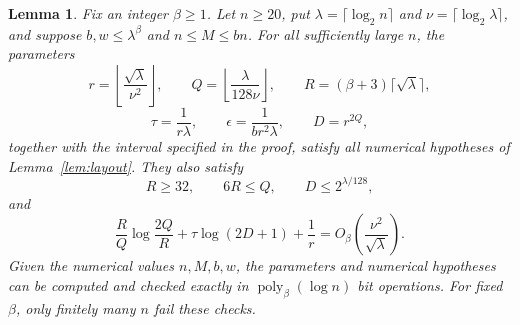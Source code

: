 \documentclass[11pt,reqno]{amsart}
\numberwithin{equation}{section}
\newtheorem{lemma}[theorem]{Lemma}
\theoremstyle{definition}\newtheorem{definition}[theorem]{Definition}
\theoremstyle{remark}\newtheorem{remark}[theorem]{Remark}
\newcommand{\poly}{\operatorname{poly}}
\renewcommand{\le}{\leqslant}
\renewcommand{\ge}{\geqslant}
\begin{document}
\begin{lemma}\label{lem:incidence-parameters}
Fix an integer $\beta\ge1$. Let $n\ge20$, put
$\lambda=\lceil\log_2 n\rceil$ and $\nu=\lceil\log_2\lambda\rceil$,
and suppose $b,w\le\lambda^\beta$ and $n\le M\le bn$.
For all sufficiently large $n$, the parameters
\begin{equation}\label{eq:parameter-QR}
 r=\left\lfloor\frac{\sqrt\lambda}{\nu^2}\right\rfloor,
 \qquad Q=\left\lfloor\frac{\lambda}{128\nu}\right\rfloor,
 \qquad R=(\beta+3)\lceil\sqrt\lambda\rceil,
\end{equation}
\[
 \tau=\frac1{r\lambda},\qquad
 \epsilon=\frac1{br^2\lambda},\qquad D=r^{2Q},
\]
together with the interval specified in the proof, satisfy all
numerical hypotheses of Lemma~\ref{lem:layout}. They also satisfy
\[
 R\ge32,\qquad 6R\le Q,\qquad D\le2^{\lambda/128},
\]
and
\begin{equation}\label{eq:balanced-cost}
 \frac RQ\log\frac{2Q}{R}+\tau\log(2D+1)+\frac1r
 =O_\beta\!\left(\frac{\nu^2}{\sqrt\lambda}\right).
\end{equation}
Given the numerical values $n,M,b,w$, the parameters and numerical
hypotheses can be computed and checked exactly in
$\poly_\beta(\log n)$ bit operations. For fixed $\beta$, only finitely
many $n$ fail these checks.
\end{lemma}
\end{document}
